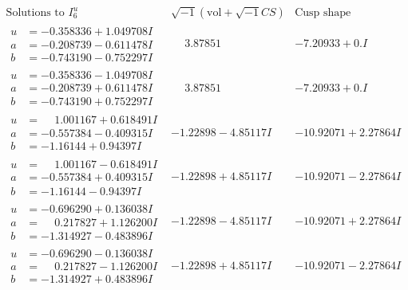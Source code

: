 \documentclass[1p]{elsarticle_modified}
\theoremstyle{definition}
\newcommand{\I}{\sqrt{-1}}
\begin{document}
$$\begin{array}{c|c|c}  
\text{Solutions to }I^u_{6}& \I (\text{vol} + \sqrt{-1}CS) & \text{Cusp shape}\\
 \hline 
\begin{aligned}
u &= -0.358336 + 1.049708 I \\
a &= -0.208739 - 0.611478 I \\
b &= -0.743190 - 0.752297 I\end{aligned}
 & \phantom{-}3.87851\phantom{ +0.000000I} & -7.20933 + 0. I\phantom{ +0.000000I} \\ \hline\begin{aligned}
u &= -0.358336 - 1.049708 I \\
a &= -0.208739 + 0.611478 I \\
b &= -0.743190 + 0.752297 I\end{aligned}
 & \phantom{-}3.87851\phantom{ +0.000000I} & -7.20933 + 0. I\phantom{ +0.000000I} \\ \hline\begin{aligned}
u &= \phantom{-}1.001167 + 0.618491 I \\
a &= -0.557384 - 0.409315 I \\
b &= -1.16144 + 0.94397 I\end{aligned}
 & -1.22898 - 4.85117 I & -10.92071 + 2.27864 I \\ \hline\begin{aligned}
u &= \phantom{-}1.001167 - 0.618491 I \\
a &= -0.557384 + 0.409315 I \\
b &= -1.16144 - 0.94397 I\end{aligned}
 & -1.22898 + 4.85117 I & -10.92071 - 2.27864 I \\ \hline\begin{aligned}
u &= -0.696290 + 0.136038 I \\
a &= \phantom{-}0.217827 + 1.126200 I \\
b &= -1.314927 - 0.483896 I\end{aligned}
 & -1.22898 - 4.85117 I & -10.92071 + 2.27864 I \\ \hline\begin{aligned}
u &= -0.696290 - 0.136038 I \\
a &= \phantom{-}0.217827 - 1.126200 I \\
b &= -1.314927 + 0.483896 I\end{aligned}
 & -1.22898 + 4.85117 I & -10.92071 - 2.27864 I \\ \hline\begin{aligned}

\end{aligned}
\end{array}$$
\end{document}
